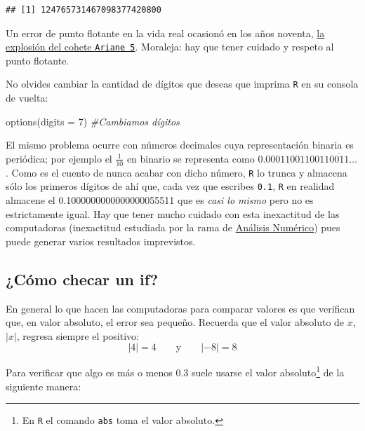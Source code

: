 \documentclass[]{tufte-book}
\newenvironment{Shaded}{}{}
\newcommand{\AttributeTok}[1]{\textcolor[rgb]{0.49,0.56,0.16}{#1}}
\newcommand{\CommentTok}[1]{\textcolor[rgb]{0.38,0.63,0.69}{\textit{#1}}}
\newcommand{\DecValTok}[1]{\textcolor[rgb]{0.25,0.63,0.44}{#1}}
\newcommand{\FunctionTok}[1]{\textcolor[rgb]{0.02,0.16,0.49}{#1}}
\newcommand{\NormalTok}[1]{#1}
\begin{document}
\begin{verbatim}
## [1] 124765731467098377420800
\end{verbatim}

\begin{marginfigure}
Un error de punto flotante en la vida real ocasionó en los años noventa,
\href{https://www.esa.int/Newsroom/Press_Releases/Ariane_501_-_Presentation_of_Inquiry_Board_report}{la
explosión del cohete \texttt{Ariane\ 5}}. Moraleja: hay que tener
cuidado y respeto al punto flotante.
\end{marginfigure}

No olvides cambiar la cantidad de dígitos que deseas que imprima
\texttt{R} en su consola de vuelta:

\begin{Shaded}
\begin{Highlighting}[]
\FunctionTok{options}\NormalTok{(}\AttributeTok{digits =} \DecValTok{7}\NormalTok{) }\CommentTok{\#Cambiamos dígitos}
\end{Highlighting}
\end{Shaded}

El mismo problema ocurre con números decimales cuya representación
binaria es periódica; por ejemplo el \(\frac{1}{10}\) en binario se
representa como \(0.0001100110011\overline{0011}\dots\). Como es el
cuento de nunca acabar con dicho número, \texttt{R} lo trunca y almacena
sólo los primeros dígitos de ahí que, cada vez que escribes
\texttt{0.1}, \texttt{R} en realidad almacene el
0.1000000000000000055511 que es \emph{casi lo mismo} pero no es
estrictamente igual. Hay que tener mucho cuidado con esta inexactitud de
las computadoras (inexactitud estudiada por la rama de
\href{https://www.springer.com/gp/book/9781461484523}{Análisis
Numérico}) pues puede generar varios resultados imprevistos.

\hypertarget{cuxf3mo-checar-un-if}{%
\subsection{¿Cómo checar un if?}\label{cuxf3mo-checar-un-if}}

En general lo que hacen las computadoras para comparar valores es que
verifican que, en valor absoluto, el error sea pequeño. Recuerda que el
valor absoluto de \(x\), \(|x|\), regresa siempre el positivo: \[
|4| = 4 \qquad \textrm{y} \qquad |-8| = 8
\]

Para verificar que algo es más o menos \(0.3\) suele usarse el valor
absoluto\footnote{En \texttt{R} el comando \texttt{abs} toma el valor
  absoluto.} de la siguiente manera:
\end{document}
